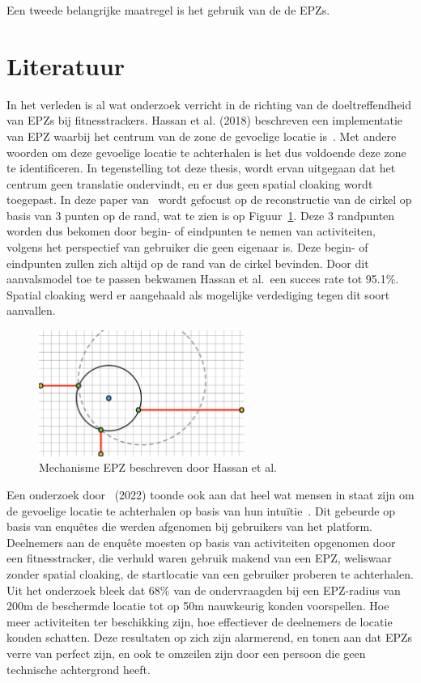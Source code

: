 Een tweede belangrijke maatregel is het gebruik van de de \acp{EPZ}.

\section{Literatuur}
In het verleden is al wat onderzoek verricht in de richting van de
doeltreffendheid van \acp{EPZ} bij fitnesstrackers. Hassan et al. (2018)
beschreven een implementatie van EPZ waarbij het centrum van de zone de
gevoelige locatie is~\cite{sec18has3:online}. Met andere woorden om deze
gevoelige locatie te achterhalen is het dus voldoende deze zone te
identificeren. In tegenstelling tot deze thesis, wordt ervan uitgegaan dat het
centrum geen translatie ondervindt, en er dus geen spatial cloaking wordt
toegepast. In deze paper van~\citeauthor{sec18has3:online} wordt gefocust op de
reconstructie van de cirkel op basis van 3 punten op de rand, wat te zien is op
Figuur~\ref{fig:Hassan_EPZ}. Deze 3 randpunten worden dus bekomen door begin-
of eindpunten te nemen van activiteiten, volgens het perspectief van gebruiker
die geen eigenaar is. Deze begin- of eindpunten zullen zich altijd op de rand
van de cirkel bevinden. Door dit aanvalsmodel toe te passen bekwamen Hassan et
al.\ een succes rate tot 95.1\%. Spatial cloaking werd er aangehaald als
mogelijke verdediging tegen dit soort aanvallen.
\begin{figure}[h]
    \centering
    \includegraphics[width=0.6\textwidth]{fig/EPZ-mechanisme/Hassan.png}
    \caption{Mechanisme EPZ beschreven door Hassan et al.~\cite{sec18has3:online}}\label{fig:Hassan_EPZ}
\end{figure}

Een onderzoek door~\citeauthor{10.1145/3491102.3502136} (2022) toonde ook aan
dat heel wat mensen in staat zijn om de gevoelige locatie te achterhalen op
basis van hun intuïtie~\cite{10.1145/3491102.3502136}. Dit gebeurde op basis
van enquêtes die werden afgenomen bij gebruikers van het platform. Deelnemers
aan de enquête moesten op basis van activiteiten opgenomen door een
fitnesstracker, die verhuld waren gebruik makend van een \ac{EPZ}, weliswaar
zonder spatial cloaking, de startlocatie van een gebruiker proberen te
achterhalen. Uit het onderzoek bleek dat 68\% van de ondervraagden bij een
\ac{EPZ}-radius van 200m de beschermde locatie tot op 50m nauwkeurig konden
voorspellen. Hoe meer activiteiten ter beschikking zijn, hoe effectiever de
deelnemers de locatie konden schatten. Deze resultaten op zich zijn alarmerend,
en tonen aan dat \acp{EPZ} verre van perfect zijn, en ook te omzeilen zijn door
een persoon die geen technische achtergrond heeft.

